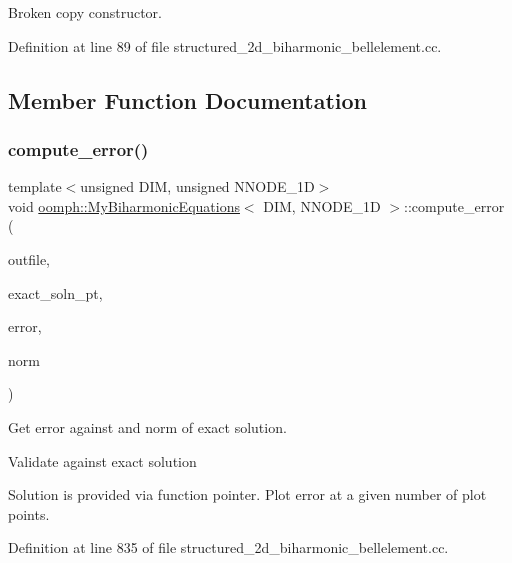 Broken copy constructor. 



Definition at line 89 of file structured\+\_\+2d\+\_\+biharmonic\+\_\+bellelement.\+cc.



\subsection{Member Function Documentation}
\mbox{\label{classoomph_1_1MyBiharmonicEquations_ac605d044c4e8c0483dcdf9b3b9e6634d}} 
\subsubsection{\texorpdfstring{compute\+\_\+error()}{compute\_error()}\hspace{0.1cm}{\footnotesize\ttfamily [1/2]}}
{\footnotesize\ttfamily template$<$unsigned D\+IM, unsigned N\+N\+O\+D\+E\+\_\+1D$>$ \\
void \hyperlink{classoomph_1_1MyBiharmonicEquations}{oomph\+::\+My\+Biharmonic\+Equations}$<$ D\+IM, N\+N\+O\+D\+E\+\_\+1D $>$\+::compute\+\_\+error (\begin{DoxyParamCaption}\item[{std\+::ostream \&}]{outfile,  }\item[{Finite\+Element\+::\+Steady\+Exact\+Solution\+Fct\+Pt}]{exact\+\_\+soln\+\_\+pt,  }\item[{double \&}]{error,  }\item[{double \&}]{norm }\end{DoxyParamCaption})}



Get error against and norm of exact solution. 

Validate against exact solution

Solution is provided via function pointer. Plot error at a given number of plot points. 

Definition at line 835 of file structured\+\_\+2d\+\_\+biharmonic\+\_\+bellelement.\+cc.

\mbox{\label{classoomph_1_1MyBiharmonicEquations_a617b8c8dc3dbac7aeb9d466f6da4edb9}} 
